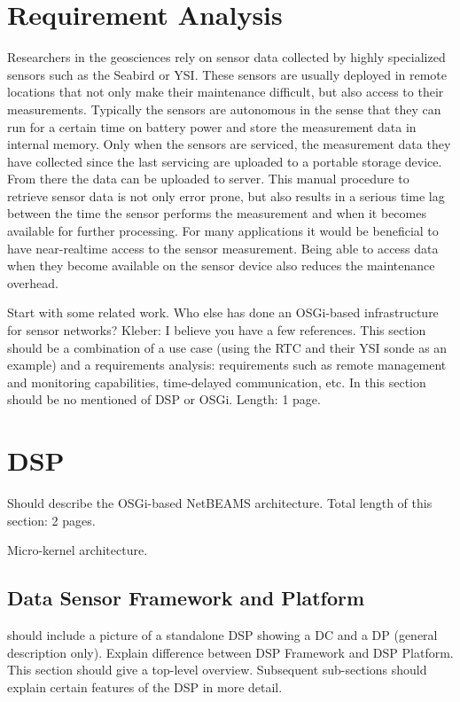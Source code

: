 \documentclass[conference]{IEEEtran}
\begin{document}
\section{Requirement Analysis}

Researchers in the geosciences rely on sensor data collected by highly
specialized sensors such as the Seabird or YSI. These sensors are
usually deployed in remote locations that not only make their
maintenance difficult, but also access to their measurements.
Typically the sensors are autonomous in the sense that they can run
for a certain time on battery power and store the measurement data in
internal memory. Only when the sensors are serviced, the measurement
data they have collected since the last servicing are uploaded to a
portable storage device. From there the data can be uploaded to
server. This manual procedure to retrieve sensor data is not only
error prone, but also results in a serious time lag between the time
the sensor performs the measurement and when it becomes available for
further processing. For many applications it would be beneficial to
have near-realtime access to the sensor measurement. Being able to
access data when they become available on the sensor device also
reduces the maintenance overhead.

Start with some related work. Who else has done an OSGi-based
infrastructure for sensor networks? Kleber: I believe you have a few
references. This section should be a combination of a use case (using
the RTC and their YSI sonde as an example) and a requirements
analysis: requirements such as remote management and monitoring
capabilities, time-delayed communication, etc. In this section should
be no mentioned of DSP or OSGi. Length: 1 page.

\section{DSP}

Should describe the OSGi-based NetBEAMS architecture. Total length of
this section: 2 pages.

Micro-kernel architecture.

\subsection{Data Sensor Framework and Platform}

should include a picture of a standalone DSP showing a DC and a DP
(general description only). Explain difference between DSP Framework
and DSP Platform. This section should give a top-level overview.
Subsequent sub-sections should explain certain features of the DSP in
more detail.
\end{document}
